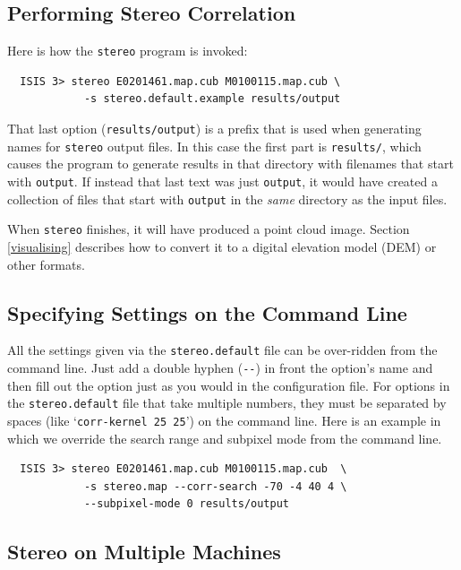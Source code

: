 \subsection{Performing Stereo Correlation}\label{perform-stereo}

Here is how the \texttt{stereo} program is invoked:

\begin{verbatim}
  ISIS 3> stereo E0201461.map.cub M0100115.map.cub \
            -s stereo.default.example results/output
\end{verbatim}

\noindent
That last option (\texttt{results/output}) is a prefix that
is used when generating names for \texttt{stereo} output files.  In
this case the first part is \texttt{results/}, which causes the
program to generate results in that directory with filenames that start
with \texttt{output}. If instead that last text was just
\texttt{output}, it would have created a collection of files
that start with \texttt{output} in the {\em same} directory as
the input files.

When \texttt{stereo} finishes, it will have produced a point cloud
image. Section \ref{visualising} describes how to convert it to a
digital elevation model (DEM) or other formats.

\subsection{Specifying Settings on the Command Line}

All the settings given via the \texttt{stereo.default} file can be
over-ridden from the command line. Just add a double hyphen
(\texttt{-\/-}) in front the option's name and then fill out the option
just as you would in the configuration file. For options in the
\texttt{stereo.default} file that take multiple numbers, they must be
separated by spaces (like `\texttt{corr-kernel~25~25}') on the command
line. Here is an example in which we override the search range and
subpixel mode from the command line.

\begin{verbatim}
  ISIS 3> stereo E0201461.map.cub M0100115.map.cub  \
            -s stereo.map --corr-search -70 -4 40 4 \
            --subpixel-mode 0 results/output
\end{verbatim}

\subsection{Stereo on Multiple Machines}

